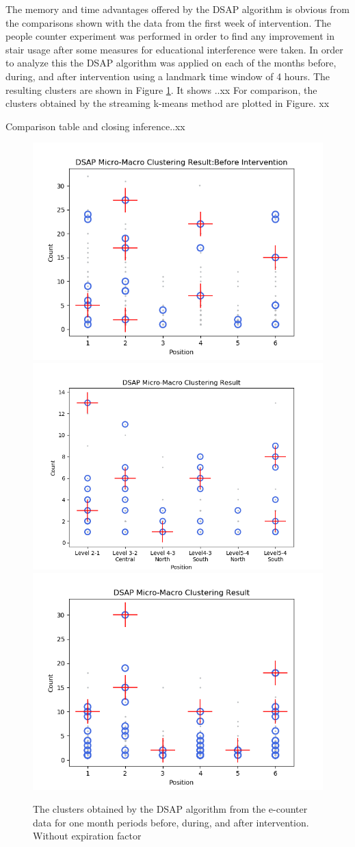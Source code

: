 The memory and time advantages offered by the DSAP algorithm is obvious from the comparisons shown with the data from the first week of intervention. The people counter experiment was performed in order to find any improvement in stair usage after some measures for educational interference were taken. In order to analyze this the DSAP algorithm was applied on each of the months before, during, and after intervention using a landmark time window of 4 hours. The resulting clusters are shown in Figure \ref{dsap3mon}. It shows ..xx
For comparison, the clusters obtained by the streaming k-means method are plotted in Figure. xx

Comparison table and closing inference..xx
\begin{figure}[!h]
    \centering
    \includegraphics[width=.47\textwidth]{image/Chapters/Chapter6/DSAPBeforeMonthIntervention.png}
    \includegraphics[width=.51\textwidth]{image/Chapters/Chapter6/window10H.png}
    \includegraphics[width=.49\textwidth]{image/Chapters/Chapter6/DSAPAFTERmonthIntervention.png}
    \caption{The clusters obtained by the DSAP algorithm from the e-counter data for one month periods before, during, and after intervention. Without expiration factor}
    \label{dsap3mon}
\end{figure}

